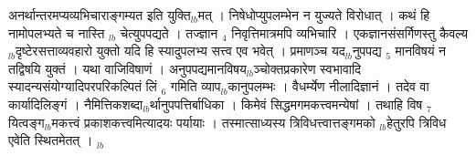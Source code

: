 \documentclass[article,12pt,a4paper]{memoir}%
\newcounter{parCount}
\begin{document}
अनर्थान्तरमप्यव्यभिचाराङ्गम्यत इति युक्ति{\tiny $_{lb}$}मत् । निषेधोप्युपलम्भेन न युज्यते विरोधात् । कथं हि नामोपलभ्यते च नास्ति {\tiny $_{lb}$} \leavevmode{} चेत्युपपद्यते । तज्ज्ञान {\tiny $_{4}$} निवृत्तिमात्रमपि व्यभिचारि । एकज्ञानसंसर्गिणस्तु कैवल्य{\tiny $_{lb}$}दृष्टेरसत्ताव्यवहारो युक्तो यदि हि स्यादुपलभ्य सत्त्व एव भवेत् । प्रमाणञ्च यद{\tiny $_{lb}$}नुपपद्य {\tiny $_{5}$} मानविषयं न तद्विषयि युक्तं । यथा वाजिविषाणं । अनुपपद्यमानविषय{\tiny $_{lb}$}ञ्चोक्तप्रकारेण स्वभावादि स्यादन्यसंयोग्यादिपरपरिकल्पितं लिं {\tiny $_{6}$} गमिति व्याप{\tiny $_{lb}$}कानुपलम्भः । वैधर्म्येण नीलादिज्ञानं । तदेव वा कार्यादिलिङ्गं । नैमित्तिकशब्दा{\tiny $_{lb}$}र्थानुपपत्तिर्बाधिका । किमेवं सिद्धमगमकत्त्वमन्येषां । तथाहि विष {\tiny $_{7}$} यित्वङ्ग{\tiny $_{lb}$}मकत्त्वं प्रकाशकत्त्वमित्यादयः पर्यायाः । तस्मात्साध्यस्य त्रिविधत्त्वात्तङ्गमको {\tiny $_{lb}$}हेतुरपि त्रिविध एवेति स्थितमेतत् ।
	{}
	\pend%
      {\tiny $_{lb}$}
\end{document}
